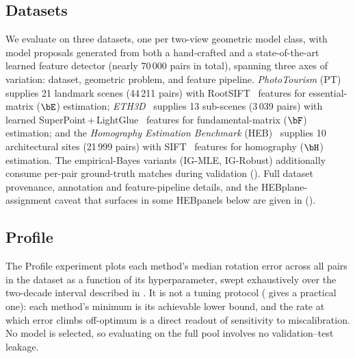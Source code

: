 \documentclass{article}
\newcommand{\mname}[1]{\texorpdfstring{#1\xspace}{#1}}
\newcommand{\igmle}{\mname{IG-MLE}}
\newcommand{\igrobust}{\mname{IG-Robust}}
\newcommand{\phototourism}{\mname{PhotoTourism}}
\newcommand{\ethd}{\mname{ETH3D}}
\newcommand{\heb}{\mname{HEB}}
\newcommand{\rootsift}{\mname{RootSIFT}}
\newcommand{\superpoint}{\mname{SuperPoint}}
\newcommand{\lightglue}{\mname{LightGlue}}
\begin{document}
\subsection{Datasets}
\label{sec:datasets}

We evaluate on three datasets, one per two-view geometric
model class, with model proposals generated from both a
hand-crafted and a state-of-the-art learned feature detector
(nearly $70\,000$ pairs in total), spanning three axes of
variation: dataset, geometric problem, and feature pipeline.
\emph{\phototourism} (PT)~\cite{Jin2021,RansacTutorial2020}
supplies 21 landmark scenes (44\,211 pairs) with
\rootsift~\cite{Arandjelovic2012} features for essential-matrix
($\bE$) estimation; \emph{\ethd}~\cite{Schoeps2017} supplies 13
sub-scenes (3\,039 pairs) with learned
\superpoint\,+\,\lightglue~\cite{DeTone2018,Lindenberger2023}
features for fundamental-matrix ($\bF$) estimation; and the
\emph{Homography Estimation Benchmark} (\heb)~\cite{Barath2023}
supplies 10 architectural sites (21\,999 pairs) with
SIFT~\cite{Lowe2004} features for homography ($\bH$)
estimation.  The empirical-Bayes variants (\igmle, \igrobust)
additionally consume per-pair ground-truth matches during
validation ().  Full dataset
provenance, annotation and feature-pipeline details, and the
\heb plane-assignment caveat that surfaces in some \heb panels
below are given in 
().

\subsection{Profile}
\label{sec:profile}

The Profile experiment plots each method's median rotation
error across all pairs in the dataset as a function of its
hyperparameter, swept exhaustively over the two-decade
interval described in .  It is not a
tuning protocol ( gives a practical one):
each method's minimum is its achievable lower bound, and the rate at
which error climbs off-optimum is a direct readout of sensitivity to
miscalibration.  No model is selected, so evaluating on the full pool
involves no validation--test leakage.

\end{document}
